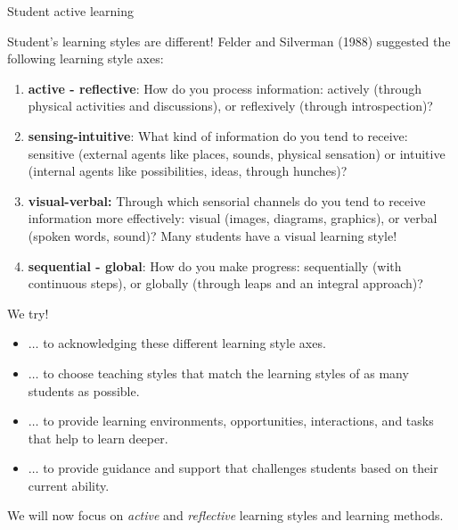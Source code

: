 \documentclass[10pt,ignorenonframetext,]{beamer}
\begin{document}
\begin{frame}{Student active learning}

Student's learning styles are different! Felder and Silverman (1988)
suggested the following learning style axes:

\begin{enumerate}
\def\labelenumi{\arabic{enumi})}
\item
  \textbf{active - reflective}: How do you process information: actively
  (through physical activities and discussions), or reflexively (through
  introspection)?
\item
  \textbf{sensing-intuitive}: What kind of information do you tend to
  receive: sensitive (external agents like places, sounds, physical
  sensation) or intuitive (internal agents like possibilities, ideas,
  through hunches)?
\item
  \textbf{visual-verbal:} Through which sensorial channels do you tend
  to receive information more effectively: visual (images, diagrams,
  graphics), or verbal (spoken words, sound)? Many students have a
  visual learning style!
\item
  \textbf{sequential - global}: How do you make progress: sequentially
  (with continuous steps), or globally (through leaps and an integral
  approach)?
\end{enumerate}

\end{frame}

\begin{frame}

\begin{block}{We try!}

\vspace{2mm}

\begin{itemize}
\item
  \(\ldots\) to acknowledging these different learning style axes.
\item
  \(\ldots\) to choose teaching styles that match the learning styles of
  as many students as possible.
\end{itemize}

\vspace{-3mm}

\begin{itemize}
\item
  \(\ldots\) to provide learning environments, opportunities,
  interactions, and tasks that help to learn deeper.
\item
  \(\ldots\) to provide guidance and support that challenges students
  based on their current ability.
\end{itemize}

We will now focus on \emph{active} and \emph{reflective} learning styles
and learning methods.

\end{block}

\end{frame}
\end{document}
